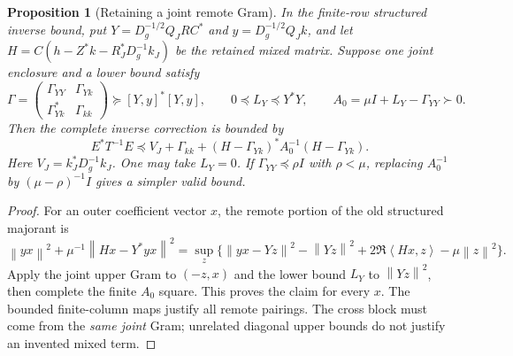 \documentclass[11pt]{article}
\newtheorem{proposition}[theorem]{Proposition}
\theoremstyle{remark}
\newcommand{\norm}[1]{\left\lVert #1\right\rVert}
\newcommand{\ip}[2]{\left\langle #1,#2\right\rangle}
\begin{document}
\begin{proposition}[Retaining a joint remote Gram]
\label{prop:v125-joint-remote}
In the finite-row structured inverse bound, put
$Y=D_g^{-1/2}Q_JRC^*$ and $y=D_g^{-1/2}Q_Jk$, and let
$H=C(h-Z^*k-R_J^*D_g^{-1}k_J)$ be the retained mixed matrix.
Suppose one joint enclosure and a lower bound satisfy
\[
 \Gamma=\begin{pmatrix}\Gamma_{YY}&\Gamma_{Yk}\\
 \Gamma_{Yk}^*&\Gamma_{kk}\end{pmatrix}
 \succeq [Y,y]^*[Y,y],\qquad 0\preceq L_Y\preceq Y^*Y,
 \qquad A_0=\mu I+L_Y-\Gamma_{YY}\succ0.
\]
Then the complete inverse correction is bounded by
\begin{equation}\label{eq:v125-joint-remote}
 E^*T^{-1}E\preceq V_J+\Gamma_{kk}
 +(H-\Gamma_{Yk})^*A_0^{-1}(H-\Gamma_{Yk}).
\end{equation}
Here $V_J=k_J^*D_g^{-1}k_J$.  One may take $L_Y=0$.
If $\Gamma_{YY}\preceq\rho I$ with $\rho<\mu$, replacing
$A_0^{-1}$ by $(\mu-\rho)^{-1}I$ gives a simpler valid bound.
\end{proposition}
\begin{proof}
For an outer coefficient vector $x$, the remote portion of the old
structured majorant is
\[
 \norm{yx}^2+\mu^{-1}\norm{Hx-Y^*yx}^2
 =\sup_z\{\norm{yx-Yz}^2-\norm{Yz}^2
       +2\Re\ip{Hx}{z}-\mu\norm z^2\}.
\]
Apply the joint upper Gram to $(-z,x)$ and the lower bound $L_Y$
to $\norm{Yz}^2$, then complete the finite $A_0$ square.
This proves the claim for every $x$.  The bounded finite-column maps
justify all remote pairings.  The cross block must come from the
\emph{same joint} Gram; unrelated diagonal upper bounds do not
justify an invented mixed term.
\end{proof}
\end{document}
